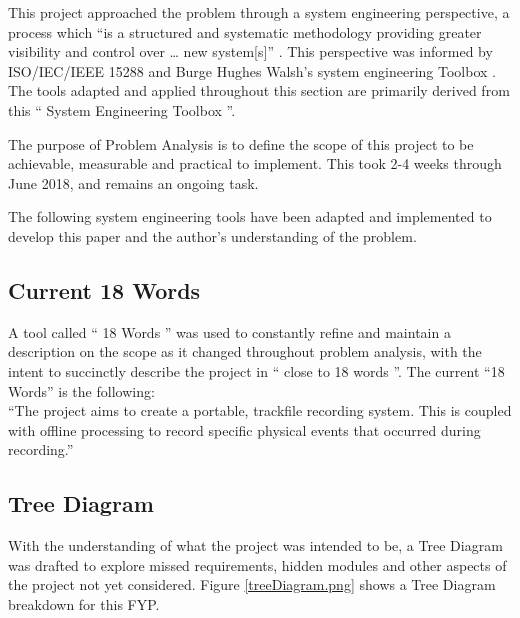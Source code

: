 \documentclass{UoNMCHA}
\newcommand{\inlineQuote}[1]{`` #1 ''}
\newcommand{\fref}[1] {Figure \ref{#1}}
\numberwithin{equation}{section}
\begin{document}
This project approached the problem through a system engineering perspective, a process which “is a structured and systematic methodology providing greater visibility and control over … new system[s]” \cite{limited2018systems}. This perspective was informed by ISO/IEC/IEEE 15288 \cite{IEEE15288} and Burge Hughes Walsh’s system engineering Toolbox \cite{SysThink2015}. The tools adapted and applied throughout this section are primarily derived from this \inlineQuote{System Engineering Toolbox}. 

The purpose of Problem Analysis is to define the scope of this project to be achievable, measurable and practical to implement. This took 2-4 weeks through June 2018, and remains an ongoing task. 

The following system engineering tools have been adapted and implemented to develop this paper and the author’s understanding of the problem. 

\subsection{Current 18 Words}
A tool called \inlineQuote{18 Words} was used to constantly refine and maintain a description on the scope as it changed throughout problem analysis, with the intent to succinctly describe the project in \inlineQuote{close to 18 words}. The current “18 Words” is the following:\\
“The project aims to create a portable, trackfile recording system. This is coupled with offline processing to record specific physical events that occurred during recording.” 

\subsection{Tree Diagram}
With the understanding of what the project was intended to be, a Tree Diagram was drafted to explore missed requirements, hidden modules and other aspects of the project not yet considered. \fref{treeDiagram.png} shows a Tree Diagram breakdown for this FYP.
\end{document}

